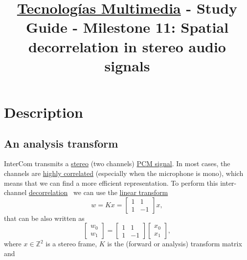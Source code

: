 \title{\href{https://www.ual.es/estudios/grados/presentacion/plandeestudios/asignatura/4015/40154321?idioma=zh_CN}{Tecnologías Multimedia} - Study Guide - Milestone 11: Spatial decorrelation in stereo audio signals}

\maketitle

\section{Description}

\subsection{An analysis transform}
InterCom transmits a
\href{https://en.wikipedia.org/wiki/Stereophonic_sound}{stereo} (two
channels)
\href{https://en.wikipedia.org/wiki/Pulse-code_modulation}{PCM
  signal}. In most cases, the channels are
\href{https://en.wikipedia.org/wiki/Binaural_recording}{highly
  correlated} (especially when the microphone is mono), which means
that we can find a more efficient representation. To perform this
inter-channel
\href{https://en.wikipedia.org/wiki/Decorrelation}{decorrelation}~\cite{thinkstats}
we can use the \href{https://en.wikipedia.org/wiki/Linear_map}{linear
  transform}~\cite{strang4linear}
\begin{equation}
  w = Kx = \begin{bmatrix} 1 & 1 \\ 1 & -1 \end{bmatrix}x,
  \label{eq:forward_transform_matrix_form}
\end{equation}
that can be also written as
\begin{equation}
  \begin{bmatrix}
    w_0 \\
    w_1
  \end{bmatrix}
  = 
  \begin{bmatrix} 1 & 1 \\ 1 & -1 \end{bmatrix}
  \begin{bmatrix}
    x_0 \\
    x_1
  \end{bmatrix},
  \label{eq:forward_transform_matrix_form2}
\end{equation}
where $x\in\mathbb{Z}^2$ is a stereo frame, $K$ is the (forward or
analysis) transform matrix and
